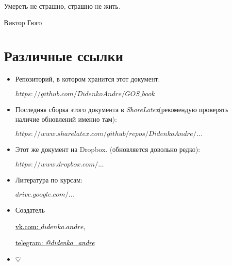 \epigraph{Умереть не страшно, страшно не жить.}{Виктор Гюго}

{\let\cleardoublepage\relax\chapter{Различные ссылки}}
\begin{itemize}
\item

Репозиторий, в котором хранится этот документ:

\href{https://github.com/DidenkoAndre/GOS_book}{$https://github.com/DidenkoAndre/GOS\_book$}

\item
Последняя сборка этого документа в \textit{ShareLatex}\newline (рекомендую проверять наличие обновлений именно там): 

\href{https://www.sharelatex.com/github/repos/DidenkoAndre/GOS_book/builds/latest/output.pdf}{$https://www.sharelatex.com/github/repos/DidenkoAndre/...$}

\item

Этот же документ на Dropbox.  \newline (обновляется довольно редко):

\href{https://www.dropbox.com/sh/7e5mfj8q68o2ipp/AAD8XvpZhiJzFbEh_IeH305ia?dl=0&preview=GOSBook.pdf}{$https://www.dropbox.com/...$}

\item
Литература по курсам:

\href{https://drive.google.com/drive/u/0/folders/0BzuzEyNkpwYDcENXcV9jNWdwVlU}{$drive.google.com/...$}

\item
Создатель

\href{https://vk.com/didenko.andre}{\textcolor{black}{vk.com: \textcolor{Purplemountainmajesty}{$didenko.andre$}}},

\href{https://telegram.me/didenko_andre}{\textcolor{black}{telegram: \textcolor{Purplemountainmajesty}{\textit{@didenko_andre}}}}

\item

$\heartsuit$
\end{itemize}
